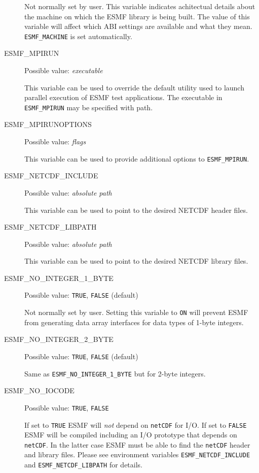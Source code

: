 \begin{description}
Not normally set by user. This variable indicates achitectual details about
the machine on which the ESMF library is being built. The value of this 
variable will affect which ABI settings are available and what they mean. 
{\tt ESMF\_MACHINE} is set automatically.

\item[ESMF\_MPIRUN]
Possible value: {\em executable}

This variable can be used to override the default utility used to launch
parallel execution of ESMF test applications. The executable in 
{\tt ESMF\_MPIRUN} may be specified with path.

\item[ESMF\_MPIRUNOPTIONS]
Possible value: {\em flags}

This variable can be used to provide additional options to {\tt ESMF\_MPIRUN}. 

\item[ESMF\_NETCDF\_INCLUDE]
Possible value: {\em absolute path}

This variable can be used to point to the desired NETCDF header files.

\item[ESMF\_NETCDF\_LIBPATH]
Possible value: {\em absolute path}

This variable can be used to point to the desired NETCDF library files.

\item[ESMF\_NO\_INTEGER\_1\_BYTE]
Possible value: {\tt TRUE}, {\tt FALSE} (default)

Not normally set by user. Setting this variable to {\tt ON} will prevent ESMF
from generating data array interfaces for data types of 1-byte integers.

\item[ESMF\_NO\_INTEGER\_2\_BYTE] 
Possible value: {\tt TRUE}, {\tt FALSE} (default)

Same as {\tt ESMF\_NO\_INTEGER\_1\_BYTE} but for 2-byte integers.

\item[ESMF\_NO\_IOCODE] 
Possible value: {\tt TRUE}, {\tt FALSE}

If set to {\tt TRUE} ESMF will {\em not} depend on {\tt netCDF} for I/O.
If set to {\tt FALSE} ESMF will be compiled including an I/O prototype that
depends on {\tt netCDF}. In the latter case ESMF must be able to find the
{\tt netCDF} header and library files. Please see environment variables
{\tt ESMF\_NETCDF\_INCLUDE} and {\tt ESMF\_NETCDF\_LIBPATH} for details.


\end{description}
